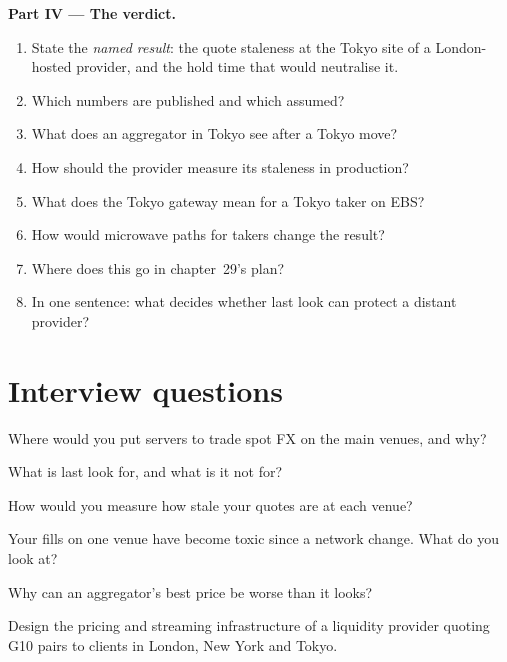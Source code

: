 \begin{problem}
\medskip\noindent\textbf{Part IV --- The verdict.}
\begin{enumerate}[resume]
\item State the \emph{named result}: the quote staleness at the Tokyo site of a London-hosted provider, and the hold time that would
  neutralise it.
\item Which numbers are published and which assumed?
\item What does an aggregator in Tokyo see after a Tokyo move?
\item How should the provider measure its staleness in production?
\item What does the Tokyo gateway mean for a Tokyo taker on EBS?
\item How would microwave paths for takers change the result?
\item Where does this go in chapter~29's plan?
\item In one sentence: what decides whether last look can protect a distant provider?
\end{enumerate}
\end{problem}

\section{Interview questions}

\begin{interviewq}\label{iq:nw:fx-connectivity:1}
Where would you put servers to trade spot FX on the main venues, and why?
\end{interviewq}

\begin{interviewq}\label{iq:nw:fx-connectivity:2}
What is last look for, and what is it not for?
\end{interviewq}

\begin{interviewq}\label{iq:nw:fx-connectivity:3}
How would you measure how stale your quotes are at each venue?
\end{interviewq}

\begin{interviewq}\label{iq:nw:fx-connectivity:4}
Your fills on one venue have become toxic since a network change. What do you look at?
\end{interviewq}

\begin{interviewq}\label{iq:nw:fx-connectivity:5}
Why can an aggregator's best price be worse than it looks?
\end{interviewq}

\begin{interviewq}\label{iq:nw:fx-connectivity:6}
Design the pricing and streaming infrastructure of a liquidity provider quoting G10 pairs to clients in London, New York and Tokyo.
\end{interviewq}

